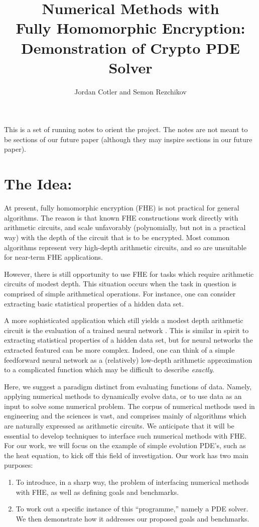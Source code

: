 \documentclass[12pt]{article}
\title{Numerical Methods with \\
Fully Homomorphic Encryption: \\ Demonstration of Crypto PDE Solver}
\author{Jordan Cotler and Semon Rezchikov}
\date{}                                           %
\begin{document}
\maketitle
This is a set of running notes to orient the project.  The notes are not meant to be sections of our future paper (although they may inspire sections in our future paper).

\section*{The Idea:}

At present, fully homomorphic encryption (FHE) is not practical for general algorithms.  The reason is that known FHE constructions work directly with arithmetic circuits, and scale unfavorably (polynomially, but not in a practical way) with the depth of the circuit that is to be encrypted.  Most common algorithms represent very high-depth arithmetic circuits, and so are unsuitable for near-term FHE applications.

However, there is still opportunity to use FHE for tasks which require arithmetic circuits of modest depth.  This situation occurs when the task in question is comprised of simple arithmetical operations.  For instance, one can consider extracting basic statistical properties of a hidden data set.

A more sophisticated application which still yields a modest depth arithmetic circuit is the evaluation of a trained neural network \cite{cryptonets1}.  This is similar in spirit to extracting statistical properties of a hidden data set, but for neural networks the extracted featured can be more complex.  Indeed, one can think of a simple feedforward neural network as a (relatively) low-depth arithmetic approximation to a complicated function which may be difficult to describe \textit{exactly}.

Here, we suggest a paradigm distinct from evaluating functions of data.  Namely, applying numerical methods to dynamically evolve data, or to use data as an input to solve some numerical problem.  The corpus of numerical methods used in engineering and the sciences is vast, and comprises mainly of algorithms which are naturally expressed as arithmetic circuits.  We anticipate that it will be essential to develop techniques to interface such numerical methods with FHE.  For our work, we will focus on the example of simple evolution PDE's, such as the heat equation, to kick off this field of investigation.  Our work has two main purposes:
\begin{enumerate}
\item To introduce, in a sharp way, the problem of interfacing numerical methods with FHE, as well as defining goals and benchmarks.
\item To work out a specific instance of this ``programme,'' namely a PDE solver.  We then demonstrate how it addresses our proposed goals and benchmarks.
\end{enumerate}
\end{document}
